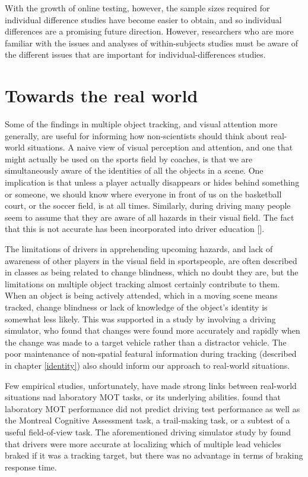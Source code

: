 \documentclass[
]{book}
\begin{document}
With the growth of online testing, however, the sample sizes required for individual difference studies have become easier to obtain, and so individual differences are a promising future direction. However, researchers who are more familiar with the issues and analyses of within-subjects studies must be aware of the different issues that are important for individual-differences studies.

\hypertarget{towards-the-real-world}{%
\chapter{Towards the real world}\label{towards-the-real-world}}

Some of the findings in multiple object tracking, and visual attention more generally, are useful for informing how non-scientists should think about real-world situations. A naive view of visual perception and attention, and one that might actually be used on the sports field by coaches, is that we
are simultaneously aware of the identities of all the objects in a scene. One implication is that unless a player actually disappears or hides behind something or someone, we should know where everyone in front of us on the basketball court, or the soccer field, is at all times. Similarly, during driving many people seem to assume that they are aware of all hazards in their visual field. The fact that this is not accurate has been incorporated into driver education {[}{]}.

The limitations of drivers in apprehending upcoming hazards, and lack of awareness of other players in the visual field in sportspeople, are often described in classes as being related to change blindness, which no doubt they are, but the limitations on multiple object tracking almost certainly contribute to them. When an object is being actively attended, which in a moving scene means tracked, change blindness or lack of knowledge of the object's identity is somewhat less likely. This was supported in a study by \citet{lochnerMultipleobjectTrackingDriving2014} involving a driving simulator, who found that changes were found more accurately and rapidly when the change was made to a target vehicle rather than a distractor vehicle. The poor maintenance of non-spatial featural information during tracking (described in chapter \ref{identity}) also should inform our approach to real-world situations.

Few empirical studies, unfortunately, have made strong links between real-world situations nad laboratory MOT tasks, or its underlying abilities. \citet{bowersCanWeImprove2013} found that laboratory MOT performance did not predict driving test performance as well as the Montreal Cognitive Assessment task, a trail-making task, or a subtest of a useful field-of-view task. The aforementioned driving simulator study by \citet{lochnerMultipleobjectTrackingDriving2014} found that drivers were more accurate at localizing which of multiple lead vehicles braked if it was a tracking target, but there was no advantage in terms of braking response time.
\end{document}
